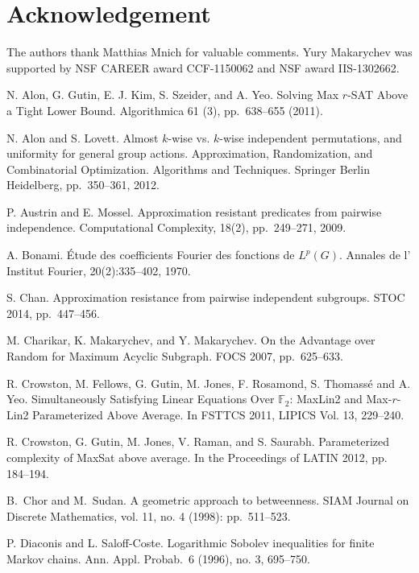 \documentclass[11pt]{article}
\begin{document}
\section*{Acknowledgement}
The authors thank Matthias Mnich for valuable comments. Yury Makarychev was supported by NSF CAREER award CCF-1150062 and NSF award IIS-1302662.


\begin{thebibliography}{WW}
 N. Alon, G. Gutin, E. J. Kim, S. Szeider, and A. Yeo. Solving Max $r$-SAT Above a Tight Lower Bound. Algorithmica 61 (3), pp.~638--655 (2011).	

N. Alon and S. Lovett. Almost $k$-wise vs. $k$-wise independent permutations, and uniformity for general group actions.
Approximation, Randomization, and Combinatorial Optimization. Algorithms and Techniques. Springer Berlin Heidelberg, pp.~350--361, 2012.

P. Austrin and E. Mossel. Approximation resistant predicates from pairwise independence. Computational Complexity, 18(2), pp.~249--271, 2009.


A. Bonami. \'{E}tude des coefficients Fourier des fonctions de $L^p(G)$. Annales de
l' Institut Fourier, 20(2):335--402, 1970.

S. Chan. Approximation resistance from pairwise independent subgroups.
STOC 2014, pp.~447--456.

M. Charikar, K. Makarychev, and Y. Makarychev.
On the Advantage over Random for Maximum Acyclic Subgraph.
FOCS 2007, pp.~625--633.



 R. Crowston, M. Fellows, G. Gutin, M. Jones, F. Rosamond, S. Thomass{\'e} and A. Yeo.
Simultaneously Satisfying Linear Equations Over $\mathbb{F}_2$: MaxLin2 and Max-$r$-Lin2
Parameterized Above Average. In FSTTCS 2011, LIPICS Vol. 13, 229--240.

R. Crowston, G. Gutin, M. Jones, V. Raman, and S. Saurabh. Parameterized complexity of MaxSat above average. In the Proceedings of LATIN 2012, pp. 184--194.

B.~Chor and M.~Sudan. A geometric approach to betweenness. SIAM Journal on Discrete Mathematics, vol. 11, no. 4 (1998): pp.~511--523.

P. Diaconis and L. Saloff-Coste. Logarithmic Sobolev inequalities for finite Markov chains. Ann. Appl. Probab.~6
(1996), no. 3, 695--750.


\end{thebibliography}
\end{document}
